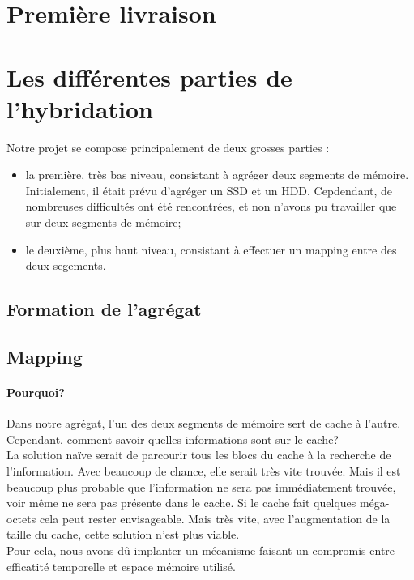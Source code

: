 \documentclass[a4paper,10pt]{article}
\begin{document}
\section{Première livraison}

\section{Les différentes parties de l'hybridation}
Notre projet se compose principalement de deux grosses parties : 
\begin{itemize}
 \item la première, très bas niveau, consistant à agréger deux segments de mémoire. Initialement, il était prévu d'agréger un SSD et un HDD. Cepdendant, de 
nombreuses difficultés ont été rencontrées, et non n'avons pu travailler que sur deux segments de mémoire;
 \item le deuxième, plus haut niveau, consistant à effectuer un mapping entre des deux segements.
\end{itemize}

\subsection{Formation de l'agrégat}

\subsection{Mapping}
\paragraph{Pourquoi?}
Dans notre agrégat, l'un des deux segments de mémoire sert de cache à l'autre. Cependant, comment savoir quelles informations sont sur le cache? \\
La solution naïve serait de parcourir tous les blocs du cache à la recherche de l'information. Avec beaucoup de chance, elle serait très vite trouvée. Mais 
il est beaucoup plus probable que l'information ne sera pas immédiatement trouvée, voir même ne sera pas présente dans le cache. Si le cache fait quelques 
méga-octets cela peut rester envisageable. Mais très vite, avec l'augmentation de la taille du cache, cette solution n'est plus viable.\\
Pour cela, nous avons dû implanter un mécanisme faisant un compromis entre efficatité temporelle et espace mémoire utilisé. 
\end{document}
